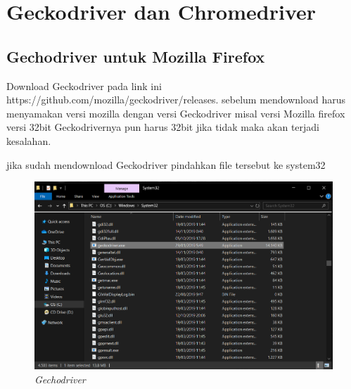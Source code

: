 \section{Geckodriver dan Chromedriver}
\subsection{Gechodriver untuk Mozilla Firefox}
\par Download Geckodriver pada link ini https://github.com/mozilla/geckodriver/releases. sebelum mendownload harus menyamakan versi mozilla dengan versi Geckodriver misal versi Mozilla firefox versi 32bit Geckodrivernya pun harus 32bit jika tidak maka akan terjadi kesalahan.

jika sudah mendownload Geckodriver pindahkan file tersebut ke system32
\begin{figure}[H]
    \centering
    \includegraphics[scale=0.3]{figures/gechodriver}
    \caption{\textit{Gechodriver}}
    \label{Geckodriver}
\end{figure}




